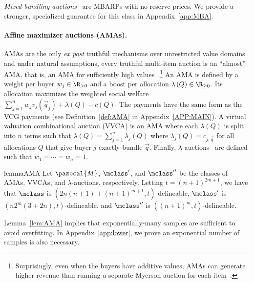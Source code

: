 \emph{Mixed-bundling auctions}~\citep{Jehiel07:Mixed} are MBARPs with no reserve prices. We provide a stronger, specialized guarantee for this class in Appendix~\ref{app:MBA}.


\paragraph{Affine maximizer auctions (AMAs).} AMAs are the
only \emph{ex post} truthful mechanisms over unrestricted
value domains~\citep{Roberts79:Characterization} and  under
natural assumptions, every truthful multi-item auction
is an ``almost'' AMA, that is, an AMA for sufficiently high values~\citep{Lavi03:Towards}.\footnote{Surprisingly, even when the buyers have additive values, AMAs can generate higher revenue than running a separate Myerson auction for each item~\citep{Sandholm15:Automated}.}
An AMA is defined by a weight per buyer $w_j \in \R_{> 0}$ and a boost per allocation $\lambda\left(Q\right) \in \R_{\geq 0}$. Its allocation maximizes the weighted social welfare $\sum_{j = 1}^n w_jv_j\left(\vec{q}_j\right) + \lambda\left(Q\right) - c\left(Q\right).$ The payments have the same form as the VCG payments (see Definition~\ref{def:AMA} in Appendix~\ref{APP:MAIN}).
A virtual valuation combinational auction (VVCA) \citep{Likhodedov04:Boosting} is an AMA where each $\lambda\left(Q\right)$ is split into $n$ terms such that $\lambda\left(Q\right) = \sum_{j = 1}^n \lambda_j\left(Q\right)$ where $\lambda_j\left(Q\right) = c_{j,\vec{q}}$ for all allocations $Q$ that give buyer $j$ exactly bundle $\vec{q}$. Finally, $\lambda$-auctions~\citep{Jehiel07:Mixed} are defined such that $w_1 = \cdots = w_n = 1$.

\begin{restatable}{lemma}{AMA}\label{lem:AMA}
Let $\pazocal{M}$, $\mclass'$, and $\mclass''$ be the classes of AMAs, VVCAs, and $\lambda$-auctions, respectively. Letting $t = \left(n+1\right)^{2m+1}$, we have that $\mclass$ is $\left(2n(n+1) + (n+1)^{m+1},t\right)$-delineable, $\mclass'$ is $\left(n2^m(3 + 2n), t\right)$-delineable, and $\mclass''$ is $\left(\left(n+1\right)^m, t\right)$-delineable.
 \end{restatable}


Lemma~\ref{lem:AMA} implies that exponentially-many samples are sufficient to avoid overfitting. In Appendix~\ref{app:lower}, we prove an exponential number of samples is also necessary.


